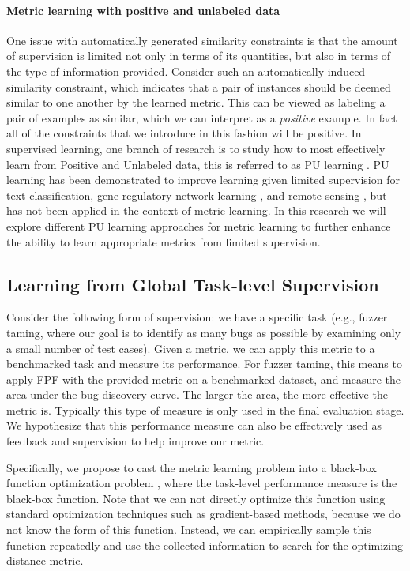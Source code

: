 \paragraph{Metric learning with positive and unlabeled data}
One issue with automatically generated similarity constraints is that
the amount of supervision is limited not only in terms of its
quantities, but also in terms of the type of information
provided. Consider such an automatically induced similarity
constraint, which indicates that a pair of instances should be deemed
similar to one another by the learned metric. This can be viewed as
labeling a pair of examples as similar, which we can interpret as a
\emph{positive} example. In fact all of the constraints that we
introduce in this fashion will be positive. In supervised learning,
one branch of research is to study how to most effectively learn from
Positive and Unlabeled data, this is referred to as PU learning
\cite{li2003learning, elkan2008learning}. PU learning has been
demonstrated to improve learning given limited supervision for text
classification\cite{li2003learning}, gene regulatory network learning
\cite{cerulo2010learning}, and remote sensing \cite{li2011positive},
but has not been applied in the context of metric learning. In this
research we will explore different PU learning approaches for metric
learning to further enhance the ability to learn appropriate metrics
from limited supervision.

\subsection{Learning from Global Task-level Supervision}
Consider the following form of supervision: we have a specific task
(e.g., fuzzer taming, where our goal is to identify as many bugs as
possible by examining only a small number of test cases). Given a
metric, we can apply this metric to a benchmarked task and measure its
performance. For fuzzer taming, this means to apply FPF with the
provided metric on a benchmarked dataset, and measure the area under the
bug discovery curve. The larger the area, the more effective the
metric is. Typically this type of measure is only used in the final
evaluation stage. We hypothesize that this performance measure can
also be effectively used as feedback and supervision to help improve
our metric.

Specifically, we propose to cast the metric learning problem into a
black-box function optimization problem \cite{jones2001taxonomy},
where the task-level performance measure is the black-box
function. Note that we can not directly optimize this function using
standard optimization techniques such as gradient-based methods,
because we do not know the form of this function. Instead, we can
empirically sample this function repeatedly and use the collected
information to search for the optimizing distance metric.

